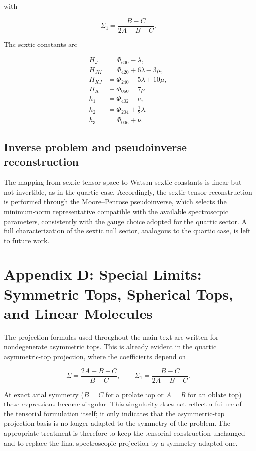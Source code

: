 \documentclass[aip,jcp,reprint,floatfix]{revtex4-2}
\begin{document}
with

\begin{equation}
\Sigma_1=\frac{B-C}{2A-B-C}.
\end{equation}

The sextic constants are

\begin{align}
H_J &= \Phi_{600}-\lambda,\\
H_{JK} &= \Phi_{420}+6\lambda-3\mu,\\
H_{KJ} &= \Phi_{240}-5\lambda+10\mu,\\
H_K &= \Phi_{060}-7\mu,\\
h_1 &= \Phi_{402}-\nu,\\
h_2 &= \Phi_{204}+\frac{1}{2}\lambda,\\
h_3 &= \Phi_{006}+\nu.
\end{align}

\subsection{Inverse problem and pseudoinverse reconstruction}

The mapping from sextic tensor space to Watson sextic constants is
linear but not invertible, as in the quartic case. Accordingly, the
sextic tensor reconstruction is performed through the Moore–Penrose
pseudoinverse, which selects the minimum-norm representative
compatible with the available spectroscopic parameters, consistently
with the gauge choice adopted for the quartic sector.
 A full characterization of the sextic null sector, analogous to the
 quartic case, is left to future work.


\section{Appendix D: Special Limits: Symmetric Tops, Spherical Tops, and Linear Molecules}
\label{sec:appendix_special_limits}

The projection formulas used throughout the main text are written for
nondegenerate asymmetric tops. This is already evident in the quartic
asymmetric-top projection, where the coefficients depend on

\begin{equation}
\Sigma = \frac{2A-B-C}{B-C},
\qquad
\Sigma_1 = \frac{B-C}{2A-B-C}.
\end{equation}

At exact axial symmetry ($B=C$ for a prolate top or $A=B$ for an oblate
top) these expressions become singular. This singularity does not
reflect a failure of the tensorial formulation itself; it only indicates
that the asymmetric-top projection basis is no longer adapted to the
symmetry of the problem. The appropriate treatment is therefore to keep
the tensorial construction unchanged and to replace the final
spectroscopic projection by a symmetry-adapted one.
\end{document}
